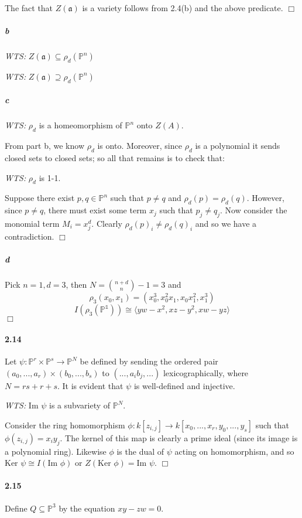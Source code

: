 \documentclass{article}
\begin{document}
The fact that $Z(\mathfrak{a})$ is a variety follows from 2.4(b) and the above predicate. $\Box$

\subparagraph{b}

\emph{WTS:} $Z(\mathfrak{a}) \subseteq \rho_d(\mathbb{P}^n)$

\emph{WTS:} $Z(\mathfrak{a}) \supseteq \rho_d(\mathbb{P}^n)$



\subparagraph{c}

\emph{WTS:} $\rho_d$ is a homeomorphism of $\mathbb{P}^n$ onto $Z(A)$.

From part b, we know $\rho_d$ is onto.  Moreover, since $\rho_d$ is a polynomial it sends closed sets to closed sets; so all that remains is to check that:

\emph{WTS:} $\rho_d$ is 1-1.

Suppose there exist $p, q \in \mathbb{P}^n$ such that $p \neq q$ and $\rho_d(p) = \rho_d(q)$.  However, since $p \neq q$, there must exist some term $x_j$ such that $p_j \neq q_j$.  Now consider the monomial term $M_i = x_j^d$.  Clearly $\rho_d(p)_i \neq \rho_d(q)_i$ and so we have a contradiction.  $\Box$

\subparagraph{d}
Pick $n = 1, d = 3$, then $N = {n + d \choose n} - 1 = 3$ and 
\[ \rho_3(x_0, x_1) = (x_0^3, x_0^2 x_1, x_0 x_1^2, x_1^3 ) \]
\[ I(\rho_3 (\mathbb{P^1})) \cong \langle y w - x^2, x z - y^2,  x w - y z \rangle \] $\Box$

\paragraph{2.14}
Let $\psi : \mathbb{P}^r \times \mathbb{P}^s \to \mathbb{P}^N$ be defined by sending the ordered pair $(a_0, ..., a_r) \times (b_0, ..., b_s)$ to $(..., a_i b_j, ...)$ lexicographically, where $N = rs + r + s$.  It is evident that $\psi$ is well-defined and injective.

\emph{WTS:} $\textrm{Im } \psi$ is a subvariety of $\mathbb{P}^N$.

Consider the ring homomorphism $\phi : k[z_{i,j}] \to k[x_0, ... , x_r, y_0, ... , y_s]$ such that $\phi(z_{i,j}) = x_i y_j$.  The kernel of this map is clearly a prime ideal (since its image is a polynomial ring).  Likewise $\phi$ is the dual of $\psi$ acting on homomorphism, and so $\textrm{Ker } \psi \cong I(\textrm{Im }\phi)$ or $Z(\textrm{Ker }\phi) = \textrm{Im } \psi$. $\Box$

\paragraph{2.15}
Define $Q \subseteq \mathbb{P}^3$ by the equation $xy - zw = 0$.
\end{document}
